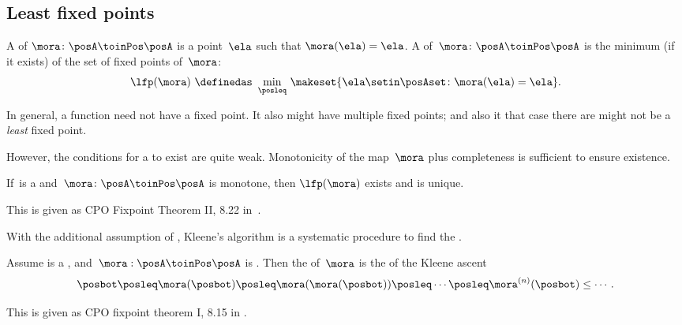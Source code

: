 \subsection{Least fixed points}

\begin{definition}
    \label{def:least-fixed}
    A  of $\mora\colon\posA\toinPos\posA$ is a point~$\ela$ such that $\mora(\ela)=\ela$.
    A  of~$\mora\colon\posA\toinPos\posA$ is the minimum (if it exists) of the set of fixed points of~$\mora$:
    \begin{equation}
        \label{eq:lfp-one}
        \lfp(\mora)\,\,\definedas\,\,\min_{\posleq}\,\makeset{\ela \setin\posAset \colon \mora(\ela)=\ela}.
    \end{equation}
\end{definition}

In general, a function need not have a fixed point.
It also might have multiple fixed points; and also it that case there are might not be a \emph{least} fixed point.

However, the conditions for a  to exist are quite weak.
%
Monotonicity of the map~$\mora$ plus completeness is sufficient to ensure existence.

\begin{lemma}
    \label{lem:CPO-fix-point-2}
    If~\posA is a \CPO and~$\mora\colon\posA\toinPos\posA$ is monotone, then $\lfp(\mora)$ exists and is unique.
\end{lemma}
This is given as CPO Fixpoint Theorem II, 8.22 in~\cite{davey02}.

With the additional assumption of , Kleene's algorithm is a systematic procedure to find the .

\begin{lemma}
    \label{lem:kleene-1}
    Assume \posA is a \CPO, and~$\mora:\linebreak[0]\posA\toinPos\posA$ is .
    Then the  of~$\mora$ is the  of the Kleene ascent  \begin{equation}
        \label{eq:kleene-iteration}
        \posbot\posleq \mora(\posbot)\posleq \mora(\mora(\posbot))\posleq\cdots\posleq \mora^{(n)}(\posbot)\leq\cdots.
    \end{equation}
\end{lemma}
This is given as CPO fixpoint theorem I, 8.15 in \cite{davey02}.

